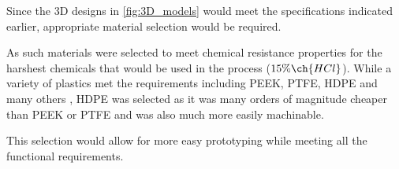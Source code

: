 Since the 3D designs in \ref{fig:3D_models} would meet the specifications indicated earlier, appropriate material selection would be required.

As such materials were selected to meet chemical resistance properties for the harshest chemicals that would be used in the process ($15\% \ch{HCl}$). While a variety of plastics met the requirements including PEEK, PTFE, HDPE and many others \cite{margolis2006engineering}, HDPE was selected as it was many orders of magnitude cheaper than PEEK or PTFE and was also much more easily machinable.

This selection would allow for more easy prototyping while meeting all the functional requirements.


